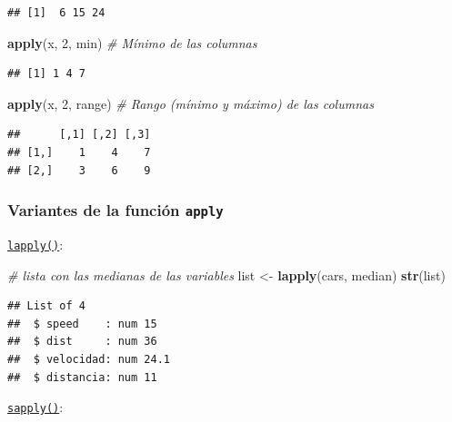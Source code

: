\documentclass[]{book}
\newenvironment{Shaded}{\begin{snugshade}}{\end{snugshade}}
\newcommand{\CommentTok}[1]{\textcolor[rgb]{0.56,0.35,0.01}{\textit{#1}}}
\newcommand{\DecValTok}[1]{\textcolor[rgb]{0.00,0.00,0.81}{#1}}
\newcommand{\KeywordTok}[1]{\textcolor[rgb]{0.13,0.29,0.53}{\textbf{#1}}}
\newcommand{\NormalTok}[1]{#1}
\newcommand{\StringTok}[1]{\textcolor[rgb]{0.31,0.60,0.02}{#1}}
\begin{document}
\begin{verbatim}
## [1]  6 15 24
\end{verbatim}

\begin{Shaded}
\begin{Highlighting}[]
\KeywordTok{apply}\NormalTok{(x, }\DecValTok{2}\NormalTok{, min)    }\CommentTok{# Mínimo de las columnas}
\end{Highlighting}
\end{Shaded}

\begin{verbatim}
## [1] 1 4 7
\end{verbatim}

\begin{Shaded}
\begin{Highlighting}[]
\KeywordTok{apply}\NormalTok{(x, }\DecValTok{2}\NormalTok{, range)  }\CommentTok{# Rango (mínimo y máximo) de las columnas}
\end{Highlighting}
\end{Shaded}

\begin{verbatim}
##      [,1] [,2] [,3]
## [1,]    1    4    7
## [2,]    3    6    9
\end{verbatim}

\hypertarget{variantes-de-la-funcion-apply}{%
\subsubsection{\texorpdfstring{Variantes de la función \texttt{apply}}{Variantes de la función apply}}\label{variantes-de-la-funcion-apply}}

\href{https://www.rdocumentation.org/packages/base/versions/3.6.1/topics/lapply}{\texttt{lapply()}}:

\begin{Shaded}
\begin{Highlighting}[]
\CommentTok{# lista con las medianas de las variables}
\NormalTok{list <-}\StringTok{ }\KeywordTok{lapply}\NormalTok{(cars, median)}
\KeywordTok{str}\NormalTok{(list)}
\end{Highlighting}
\end{Shaded}

\begin{verbatim}
## List of 4
##  $ speed    : num 15
##  $ dist     : num 36
##  $ velocidad: num 24.1
##  $ distancia: num 11
\end{verbatim}

\href{https://www.rdocumentation.org/packages/base/versions/3.6.1/topics/sapply}{\texttt{sapply()}}:
\end{document}
